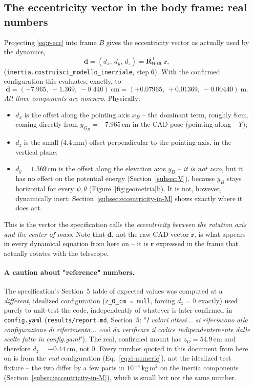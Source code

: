 \documentclass[11pt,a4paper]{article}
\numberwithin{equation}{section}
\newcommand{\bs}[1]{\boldsymbol{#1}}
\newcommand{\T}{^{\mathsf T}}
\begin{document}
\subsection{The eccentricity vector in the body frame: real numbers}
\label{subsec:d-vector}

Projecting \eqref{eq:r-ecc} into frame $B$ gives the eccentricity vector as actually used by the dynamics,
\begin{equation}
\bs d = (d_x,\,d_y,\,d_z) = \bs R_{WB0}\T\,\bs r ,
\label{eq:d-def}
\end{equation}
(\texttt{inertia.\allowbreak costruisci\_\allowbreak modello\_\allowbreak inerziale}, step 6). With the confirmed configuration this evaluates, exactly, to
\begin{equation}
\bs d = (+7.965,\ +1.369,\ -0.440)\ \text{cm} = (+0.07965,\ +0.01369,\ -0.00440)\ \text{m}.
\label{eq:d-numeric}
\end{equation}
\emph{All three components are nonzero.} Physically:
\begin{itemize}
\item $d_x$ is the offset along the pointing axis $x_B$ -- the dominant term, roughly 8\,cm, coming directly from $y_{G_B}=-7.965$\,cm in the CAD pose (pointing along $-Y$);
\item $d_z$ is the small (4.4\,mm) offset perpendicular to the pointing axis, in the vertical plane;
\item $d_y = 1.369$\,cm is the offset along the elevation axis $y_B$ -- \emph{it is not zero}, but it has no effect on the potential energy (Section~\ref{subsec:V}), because $y_B$ stays horizontal for every $\psi,\theta$ (Figure~\ref{fig:geometria}b). It is not, however, dynamically inert: Section~\ref{subsec:eccentricity-in-M} shows exactly where it does act.
\end{itemize}
This is the vector the specification calls the \emph{eccentricity between the rotation axis and the center of mass}. Note that $\bs d$, not the raw CAD vector $\bs r$, is what appears in every dynamical equation from here on -- it is $\bs r$ expressed in the frame that actually rotates with the telescope.

\paragraph{A caution about "reference" numbers.} The specification's Section~5 table of expected values was computed at a \emph{different}, idealized configuration (\texttt{z\_O\_cm = null}, forcing $d_z=0$ exactly) used purely to unit-test the code, independently of whatever is later confirmed in \texttt{config.yaml} (\texttt{results/report.md}, Section~5: "\emph{I valori attesi... si riferiscono alla configurazione di riferimento... così da verificare il codice indipendentemente dalle scelte fatte in config.yaml}"). The real, confirmed mount has $z_O=54.9$\,cm and therefore $d_z = -0.44$\,cm, not $0$. Every number quoted in this document from here on is from the \emph{real} configuration (Eq.~\eqref{eq:d-numeric}), not the idealized test fixture -- the two differ by a few parts in $10^{-4}\,\mathrm{kg\,m^2}$ on the inertia components (Section~\ref{subsec:eccentricity-in-M}), which is small but not the same number.
\end{document}
